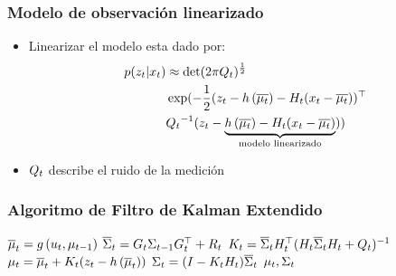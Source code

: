 \begin{frame}
	\frametitle{Modelo de observación linearizado}
	
	\begin{itemize}
		\item Linearizar el modelo esta dado por:
		\begin{align*}
			p(z_{t} | x_{t}) &\approx \det(2 \pi Q_{t})^{\frac{1}{2}}\\
			&\exp (-\dfrac{1}{2} (z_{t} - h\left( \overline{\mu_{t}} \right) - H_{t}(x_{t} - \overline{\mu_{t}}))^{\top}\\
			&{Q_{t}}^{-1} (z_{t} - \underbrace{h\left( \overline{\mu_{t}} \right) - H_{t} (x_{t}-\overline{\mu_{t}})}_{\text{modelo linearizado}}))
		\end{align*}
		
		\item $Q_{t}$ describe el ruido de la medición
	\end{itemize}	
	
	
\end{frame}

\begin{frame}
	\frametitle{Algoritmo de Filtro de Kalman Extendido}
	
    \begin{algorithmic}[1]
        \State $\overline{\mu}_{t} = g\left( u_{t}, \mu_{t-1} \right)$
        \State $\overline{\Sigma}_{t} = G_{t} \Sigma_{t-1} G_{t}^{\top}+R_{t}$
        \Statex
        \State $K_{t} = \overline{\Sigma}_{t} H_{t}^{\top} (H_{t} \overline{\Sigma}_{t}  H_{t} + Q_{t})^{-1} $
        \State $\mu_{t} = \overline{\mu}_{t} + K_{t} (z_{t} - h\left( \overline{\mu}_{t} \right))$
        \State $\Sigma_{t} =  (I - K_{t} H_{t}) \overline{\Sigma}_{t}$
        \State \Return $\mu_{t}, \Sigma_{t}$
    \EndProcedure
    \end{algorithmic}
\end{frame}


